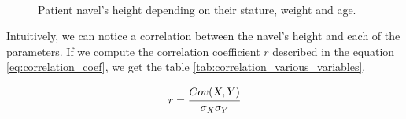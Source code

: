 \documentclass{article}
\begin{document}
\begin{figure}[H]
    \centering
     \\
    \caption{Patient navel's height depending on their stature, weight and age.}
    \label{fig:estimation_navel_various_parameters}
\end{figure}

Intuitively, we can notice a correlation between the navel's height and each of the parameters. If we compute the correlation coefficient $r$ described in the equation \ref{eq:correlation_coef}, we get the table \ref{tab:correlation_various_variables}.

\begin{equation}
\label{eq:correlation_coef}
    r = \cfrac{Cov(X,Y)}{\sigma_X \sigma_Y}
\end{equation}
\end{document}
